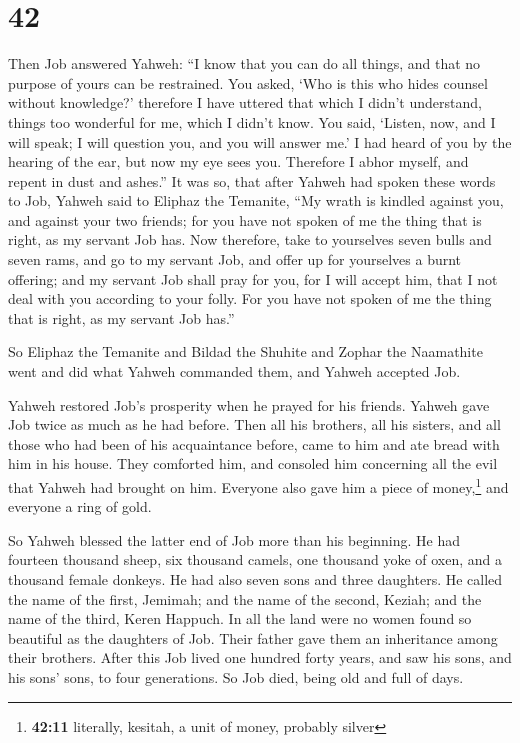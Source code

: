 \hypertarget{section-24}{%
\section{42}\label{section-24}}

 Then Job answered Yahweh:  ``I know that
you can do all things, and that no purpose of yours can be restrained.
 You asked, `Who is this who hides counsel without
knowledge?' therefore I have uttered that which I didn't understand,
things too wonderful for me, which I didn't know.  You
said, `Listen, now, and I will speak; I will question you, and you will
answer me.'  I had heard of you by the hearing of the ear,
but now my eye sees you.  Therefore I abhor myself, and
repent in dust and ashes.''  It was so, that after Yahweh
had spoken these words to Job, Yahweh said to Eliphaz the Temanite, ``My
wrath is kindled against you, and against your two friends; for you have
not spoken of me the thing that is right, as my servant Job has.
 Now therefore, take to yourselves seven bulls and seven
rams, and go to my servant Job, and offer up for yourselves a burnt
offering; and my servant Job shall pray for you, for I will accept him,
that I not deal with you according to your folly. For you have not
spoken of me the thing that is right, as my servant Job has.''

 So Eliphaz the Temanite and Bildad the Shuhite and Zophar
the Naamathite went and did what Yahweh commanded them, and Yahweh
accepted Job.

 Yahweh restored Job's prosperity when he prayed for his
friends. Yahweh gave Job twice as much as he had before. 
Then all his brothers, all his sisters, and all those who had been of
his acquaintance before, came to him and ate bread with him in his
house. They comforted him, and consoled him concerning all the evil that
Yahweh had brought on him. Everyone also gave him a piece of
money,\footnote{\textbf{42:11} literally, kesitah, a unit of money,
  probably silver} and everyone a ring of gold.

 So Yahweh blessed the latter end of Job more than his
beginning. He had fourteen thousand sheep, six thousand camels, one
thousand yoke of oxen, and a thousand female donkeys.  He
had also seven sons and three daughters.  He called the
name of the first, Jemimah; and the name of the second, Keziah; and the
name of the third, Keren Happuch.  In all the land were
no women found so beautiful as the daughters of Job. Their father gave
them an inheritance among their brothers.  After this Job
lived one hundred forty years, and saw his sons, and his sons' sons, to
four generations.  So Job died, being old and full of
days.
